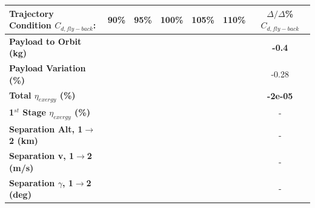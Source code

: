 \begin{table}[!ht]
	\centering
	\begin{tabular}{l c c c c c c} 
		\hline \textbf{Trajectory Condition}   \qquad  $C_{d,fly-back}$:
		&90\%
		&95\%
		&100\%
		&105\%
		&110\%
		& $\Delta/\Delta$\%$C_{d,fly-back}$
		\\
		\hline \textbf{Payload to Orbit (kg)}
		& \textbf{\PayloadToOrbitCdReturnNinety}
		& \textbf{\PayloadToOrbitCdReturnNinetyFive}
		& \textbf{\PayloadToOrbitCdReturnStandard}
		& \textbf{\PayloadToOrbitCdReturnOneHundredFive}
		& \textbf{\PayloadToOrbitCdReturnOneHundredTen}
		&\textbf{-0.4}
		\\
		\textbf{Payload Variation (\%)}
		& \PayloadVarCdReturnNinety
		& \PayloadVarCdReturnNinetyFive
		& \PayloadVarCdReturnStandard
		& \PayloadVarCdReturnOneHundredFive
		& \PayloadVarCdReturnOneHundredTen
		&-0.28
		\\
		\textbf{Total $\eta_{exergy}$ (\%)}
		& \textbf{\totalExergyEffCdReturnNinety}
		& \textbf{\totalExergyEffCdReturnNinetyFive}
		& \textbf{\totalExergyEffCdReturnStandard}
		& \textbf{\totalExergyEffCdReturnOneHundredFive}
		& \textbf{\totalExergyEffCdReturnOneHundredTen}
		& \textbf{-2e-05}
		\\
		\hline 
		\textbf{1$^{st}$ Stage $\eta_{exergy}$ (\%)}
		& \textbf{\firstExergyEffCdReturnNinety}
		& \textbf{\firstExergyEffCdReturnNinetyFive}
		& \textbf{\firstExergyEffCdReturnStandard}
		& \textbf{\firstExergyEffCdReturnOneHundredFive}
		& \textbf{\firstExergyEffCdReturnOneHundredTen}
		& -
		\\
		\textbf{Separation Alt, 1$\rightarrow$2 (km)}
		& \firstsecondSeparationAltCdReturnNinety
		& \firstsecondSeparationAltCdReturnNinetyFive
		& \firstsecondSeparationAltCdReturnStandard
		& \firstsecondSeparationAltCdReturnOneHundredFive
		& \firstsecondSeparationAltCdReturnOneHundredTen
		& -
		\\
		\textbf{Separation v, 1$\rightarrow$2 (m/s)}
		& \firstsecondSeparationvCdReturnNinety
		& \firstsecondSeparationvCdReturnNinetyFive
		& \firstsecondSeparationvCdReturnStandard
		& \firstsecondSeparationvCdReturnOneHundredFive
		& \firstsecondSeparationvCdReturnOneHundredTen
		& -
		\\
		\textbf{Separation $\gamma$, 1$\rightarrow$2 (deg)}
		& \firstsecondSeparationgammaCdReturnNinety
		& \firstsecondSeparationgammaCdReturnNinetyFive
		& \firstsecondSeparationgammaCdReturnStandard
		& \firstsecondSeparationgammaCdReturnOneHundredFive
		& \firstsecondSeparationgammaCdReturnOneHundredTen
		& -
		\\

\end{tabular}
\end{table}
